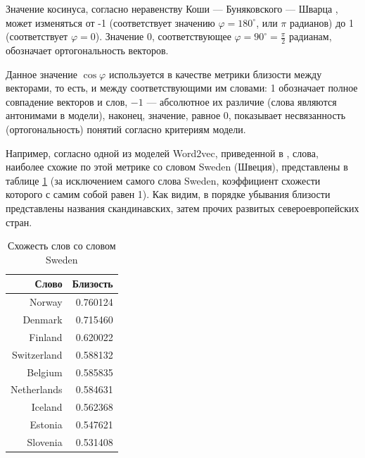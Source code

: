 Значение косинуса, согласно неравенству Коши --- Буняковского --- Шварца \cite{bhlitem176592}, может изменяться от -1
(соответствует значению $\varphi=180^{\circ}$, или $\pi$ радианов) до 1 (соответствует $\varphi=0$). Значение 0, соответствующее
$\varphi=90^{\circ}=\frac\pi2$ радианам, обозначает ортогональность векторов.

Данное значение $\cos\varphi$ используется в качестве метрики близости между векторами, то есть, и между соответствующими им словами:
1 обозначает полное совпадение векторов и слов, $-1$ --- абсолютное их различие (слова являются антонимами в модели), наконец, значение,
равное 0, показывает несвязанность (ортогональность) понятий согласно критериям модели.

Например, согласно одной из моделей Word2vec, приведенной в \cite{pathmind2021}, слова, наиболее схожие по этой метрике со словом
Sweden (Швеция), представлены в таблице \ref{tab4} (за исключением самого слова Sweden, коэффициент схожести которого с самим собой равен 1).
Как видим, в порядке убывания близости представлены названия скандинавских, затем прочих развитых североевропейских стран.

\begin{table}[tbp]
    \caption{Схожесть слов со словом Sweden}
    \begin{center}
        \begin{tabular}{rr}
            \toprule
            \textbf{Слово} & \textbf{Близость} \\
            \midrule
            Norway         & 0.760124          \\
            \midrule
            Denmark        & 0.715460          \\
            \midrule
            Finland        & 0.620022          \\
            \midrule
            Switzerland    & 0.588132          \\
            \midrule
            Belgium        & 0.585835          \\
            \midrule
            Netherlands    & 0.584631          \\
            \midrule
            Iceland        & 0.562368          \\
            \midrule
            Estonia        & 0.547621          \\
            \midrule
            Slovenia       & 0.531408          \\
            \bottomrule
        \end{tabular}\label{tab4}
    \end{center}
\end{table}

